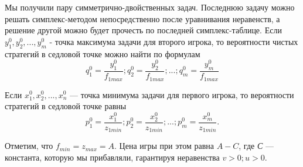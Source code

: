 Мы получили пару симметрично-двойственных задач. Последнюю задачу можно решать симплекс-методом непосредственно после уравнивания неравенств, а решение другой можно будет прочесть по последней симплекс-таблице. Если $y_1^0,y_2^0,...,y_m^0$ - точка максимума задачи для второго игрока, то вероятности чистых стратегий в седловой точке можно найти по формулам
\begin{equation}
\label{equation_4_42}
        q_1^0=\frac{y_1^0}{f_{1max}}; q_2^0=\frac{y_2^0}{f_{1max}};...; q_m^0=\frac{y_m^0}{f_{1max}}
\end{equation}

Если $x_1^0, x_2^0,...,x_n^0$  — точка минимума задачи для первого игрока, то вероятности стратегий в седловой точке равны
\begin{equation}
\label{equation_4_43}
    p_1^0=\frac{x_1^0}{z_{1min}}; p_2^0=\frac{x_2^0}{z_{1min}};...;p_m^0=\frac{x_m^0}{z_{1min}}.
\end{equation}

Отметим, что $f_{min}=z_{max}=A.$ Цена игры при этом равна $A-C$, где \emph{С} — константа, которую мы прибавляли, гарантируя неравенства $v>0; u>0.$

